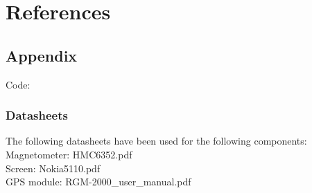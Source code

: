 \chapter{References}


\section{Appendix}

Code:\\

\subsection{Datasheets}
The following datasheets have been used for the following components:\\
Magnetometer: HMC6352.pdf\\
Screen: Nokia5110.pdf\\
GPS module: RGM-2000\_user\_manual.pdf\\